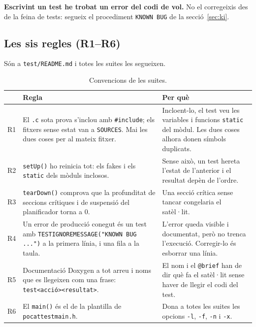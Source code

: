 \documentclass[11pt,a4paper]{article}
\DeclareRobustCommand{\_}{\textunderscore\allowbreak}
\newcommand{\cd}[1]{\texttt{#1}}
\begin{document}
\textbf{Escrivint un test he trobat un error del codi de vol.} No el corregeixis des de la
feina de tests: segueix el procediment \cd{KNOWN BUG} de la secció~\ref{sec:ki}.

\subsection{Les sis regles (R1--R6)}

Són a \cd{test/README.md} i totes les suites les segueixen.

\begin{table}[H]
\centering\small
\begin{tabularx}{\textwidth}{@{}l>{\raggedright\arraybackslash}p{4.2cm}>{\raggedright\arraybackslash}X@{}}
\toprule
 & Regla & Per què\\
\midrule
R1 & El \cd{.c} sota prova s'inclou amb \cd{\#include}; els fitxers sense estat van a \cd{SOURCES}. Mai les dues coses per al mateix fitxer. &
Incloent-lo, el test veu les variables i funcions \cd{static} del mòdul. Les dues coses alhora donen símbols duplicats.\\
R2 & \cd{setUp()} ho reinicia tot: els fakes i els \cd{static} dels mòduls inclosos. &
Sense això, un test hereta l'estat de l'anterior i el resultat depèn de l'ordre.\\
R3 & \cd{tearDown()} comprova que la profunditat de seccions crítiques i de suspensió del planificador torna a 0. &
Una secció crítica sense tancar congelaria el satèl·lit.\\
R4 & Un error de producció conegut és un test amb \cd{TEST\_IGNORE\_MESSAGE("KNOWN BUG ...")} a la primera línia, i una fila a la taula. &
L'error queda visible i documentat, però no trenca l'execució. Corregir-lo és esborrar una línia.\\
R5 & Documentació Doxygen a tot arreu i noms que es llegeixen com una frase: \cd{test\_<acció>\_<resultat>}. &
El nom i el \cd{@brief} han de dir què fa el satèl·lit sense haver de llegir el codi del test.\\
R6 & El \cd{main()} és el de la plantilla de \cd{pocat\_test\_main.h}. &
Dona a totes les suites les opcions \cd{-l}, \cd{-f}, \cd{-n} i \cd{-x}.\\
\bottomrule
\end{tabularx}
\caption{Convencions de les suites.}
\label{tab:rules}
\end{table}
\end{document}
